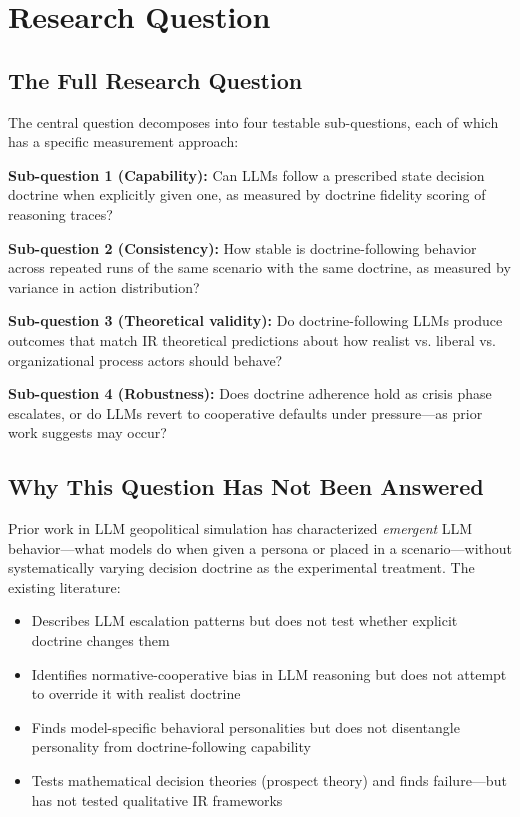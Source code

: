 \documentclass[12pt, a4paper]{article}
\begin{document}
\section{Research Question}

\subsection{The Full Research Question}

The central question decomposes into four testable sub-questions, each of which has a specific measurement approach:

\textbf{Sub-question 1 (Capability):} Can LLMs follow a prescribed state decision doctrine when explicitly given one, as measured by doctrine fidelity scoring of reasoning traces?

\textbf{Sub-question 2 (Consistency):} How stable is doctrine-following behavior across repeated runs of the same scenario with the same doctrine, as measured by variance in action distribution?

\textbf{Sub-question 3 (Theoretical validity):} Do doctrine-following LLMs produce outcomes that match IR theoretical predictions about how realist vs. liberal vs. organizational process actors should behave?

\textbf{Sub-question 4 (Robustness):} Does doctrine adherence hold as crisis phase escalates, or do LLMs revert to cooperative defaults under pressure---as prior work suggests may occur?

\subsection{Why This Question Has Not Been Answered}

Prior work in LLM geopolitical simulation has characterized \textit{emergent} LLM behavior---what models do when given a persona or placed in a scenario---without systematically varying decision doctrine as the experimental treatment. The existing literature:

\begin{itemize}[leftmargin=1.5em]
    \item Describes LLM escalation patterns but does not test whether explicit doctrine changes them
    \item Identifies normative-cooperative bias in LLM reasoning but does not attempt to override it with realist doctrine
    \item Finds model-specific behavioral personalities but does not disentangle personality from doctrine-following capability
    \item Tests mathematical decision theories (prospect theory) and finds failure---but has not tested qualitative IR frameworks
\end{itemize}
\end{document}
